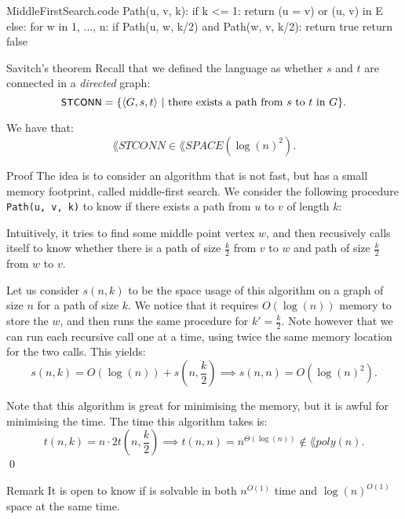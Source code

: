 \documentclass[a4paper]{article}
\begin{document}
\begin{filecontents*}[overwrite]{MiddleFirstSearch.code}
Path(u, v, k):
    if k <= 1:
        return (u = v) or (u, v) in E
    else:
        for w in {1, ..., n}:
            if Path(u, w, k/2) and Path(w, v, k/2):
                return true
    return false
\end{filecontents*}

\begin{parag}{Savitch's theorem}
    Recall that we defined the language  as whether $s$ and $t$ are connected in a \textit{directed} graph: 
    \[\lang{STCONN} = \left\{\left\langle G, s, t \right\rangle \suchthat \text{there exists a path from $s$ to $t$ in $G$}\right\}.\]

    We have that: 
    \[\lang{STCONN} \in \lang{SPACE}\left(\log\left(n\right)^2\right).\]

    \begin{subparag}{Proof}
        The idea is to consider an algorithm that is not fast, but has a small memory footprint, called middle-first search. We consider the following procedure \texttt{Path(u, v, k)} to know if there exists a path from $u$ to $v$ of length $k$:

        Intuitively, it tries to find some middle point vertex $w$, and then recusively calls itself to know whether there is a path of size $\frac{k}{2}$ from $v$ to $w$ and path of size $\frac{k}{2}$ from $w$ to $v$.

        Let us consider $s\left(n, k\right)$ to be the space usage of this algorithm on a graph of size $n$ for a path of size $k$. We notice that it requires $O\left(\log\left(n\right)\right)$ memory to store the $w$, and then runs the same procedure for $k' = \frac{k}{2}$. Note however that we can run each recursive call one at a time, using twice the same memory location for the two calls. This yields: 
        \[s\left(n, k\right) = O\left(\log\left(n\right)\right) + s\left(n, \frac{k}{2}\right) \implies s\left(n, n\right) = O\left(\log\left(n\right)^2\right).\]

        Note that this algorithm is great for minimising the memory, but it is awful for minimising the time. The time this algorithm takes is:
        \[t\left(n, k\right) = n \cdot 2t\left(n, \frac{k}{2}\right) \implies t\left(n, n\right) = n^{\Theta\left(\log\left(n\right)\right)} \not\in \lang{poly}\left(n\right).\]
        \qed
    \end{subparag}

    \begin{subparag}{Remark}
        It is open to know if  is solvable in both $n^{O\left(1\right)}$ time and $\log\left(n\right)^{O\left(1\right)}$ space at the same time.
    \end{subparag}
\end{parag}
\end{document}

